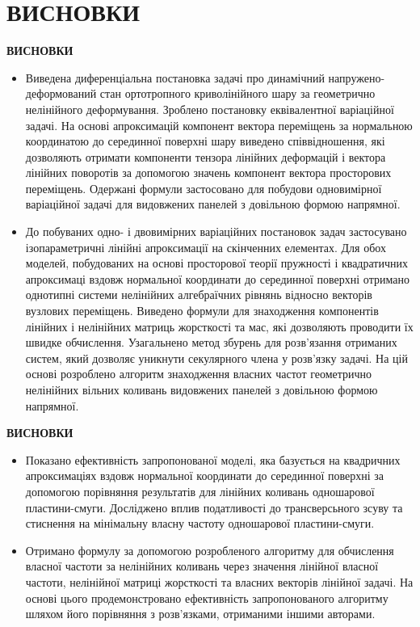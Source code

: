 \documentclass[8pt]{beamer}
\numberwithin{figure}{section}
\numberwithin{equation}{section}
\numberwithin{table}{section}
\begin{document}
\section{ВИСНОВКИ}
\begin{frame}
\textbf{\large ВИСНОВКИ}
\\
\vspace{1em}
\begin{itemize}
\item Виведена диференціальна постановка задачі про динамічний напружено-деформований стан ортотропного криволінійного шару за геометрично нелінійного деформування. Зроблено постановку еквівалентної варіаційної задачі. На основі апроксимацій компонент вектора переміщень за нормальною координатою до серединної поверхні шару виведено співвідношення, які дозволяють отримати компоненти тензора лінійних деформацій і вектора лінійних поворотів за допомогою значень компонент вектора просторових переміщень. Одержані формули застосовано для побудови одновимірної варіаційної задачі для видовжених панелей з довільною формою напрямної.
\item  До побуваних одно- і двовимірних варіаційних постановок задач  застосувано ізопараметричні лінійні апроксимації на скінченних елементах. Для обох моделей, побудованих на основі просторової теорії пружності і квадратичних апроксимаці вздовж нормальної координати до серединної поверхні отримано однотипні системи нелінійних алгебраїчних рівнянь відносно векторів вузлових переміщень. Виведено формули для знаходження компонентів лінійних і нелінійних матриць жорсткості та мас, які дозволяють проводити їх швидке обчислення. Узагальнено метод збурень для розв’язання отриманих систем, який дозволяє уникнути секулярного члена у розв’язку задачі. На цій основі розроблено алгоритм знаходження власних частот геометрично нелінійних вільних коливань видовжених панелей з довільною формою напрямної.
\end{itemize}
\end{frame}
\begin{frame}
\textbf{\large ВИСНОВКИ}
\\
\vspace{1em}
\begin{itemize}
\item  Показано ефективність запропонованої моделі, яка базується на квадричних апроксимаціях вздовж нормальної координати до серединної поверхні за допомогою порівняння результатів для лінійних коливань одношарової пластини-смуги. Досліджено вплив податливості до трансверсьного зсуву та стиснення на мінімальну власну частоту одношарової пластини-смуги.
\item  Отримано формулу за допомогою розробленого алгоритму для обчислення власної частоти за нелінійних коливань через значення лінійної власної частоти, нелінійної матриці жорсткості та власних векторів лінійної задачі. На основі цього продемонстровано ефективність запропонованого алгоритму шляхом його порівняння з розв'язками, отриманими іншими авторами.
\end{itemize}
\end{frame}
\end{document}
